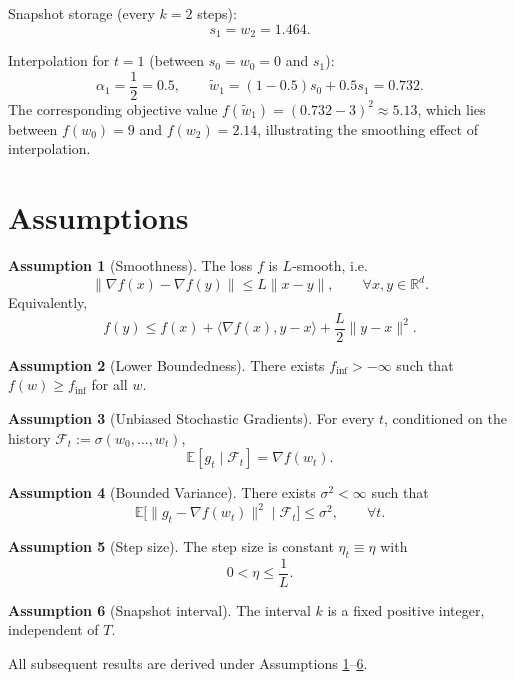 \documentclass{article}
\newcommand{\E}{\mathbb{E}}
\newcommand{\R}{\mathbb{R}}
\theoremstyle{definition}
\newtheorem{assumption}{Assumption}
\begin{document}
Snapshot storage (every $k=2$ steps):
\[
s_1 = w_{2}=1.464 .
\]

Interpolation for $t=1$ (between $s_0=w_0=0$ and $s_1$):
\[
\alpha_1=\frac{1}{2}=0.5,\qquad 
\tilde w_1 = (1-0.5) s_0 + 0.5 s_1 = 0.732 .
\]
The corresponding objective value $f(\tilde w_1)=(0.732-3)^2\approx5.13$,
which lies between $f(w_0)=9$ and $f(w_2)=2.14$, illustrating the smoothing
effect of interpolation.

\section*{Assumptions}
\begin{assumption}[Smoothness]\label{as:smooth}
The loss $f$ is $L$‑smooth, i.e.
\[
\|\nabla f(x)-\nabla f(y)\|\le L\|x-y\|,\qquad\forall x,y\in\R^{d}.
\]
Equivalently,
\[
f(y)\le f(x)+\langle\nabla f(x),y-x\rangle+\frac{L}{2}\|y-x\|^{2}.
\tag{A1}
\]
\end{assumption}

\begin{assumption}[Lower Boundedness]\label{as:lower}
There exists $f_{\inf}>-\infty$ such that $f(w)\ge f_{\inf}$ for all $w$.
\end{assumption}

\begin{assumption}[Unbiased Stochastic Gradients]\label{as:unbiased}
For every $t$, conditioned on the history $\mathcal{F}_t:=\sigma(w_0,\dots,w_t)$,
\[
\E[g_t\mid\mathcal{F}_t]=\nabla f(w_t).
\tag{A3}
\]
\end{assumption}

\begin{assumption}[Bounded Variance]\label{as:variance}
There exists $\sigma^{2}<\infty$ such that
\[
\E\big[\|g_t-\nabla f(w_t)\|^{2}\mid\mathcal{F}_t\big]\le\sigma^{2},
\qquad\forall t.
\tag{A4}
\]
\end{assumption}

\begin{assumption}[Step size]\label{as:stepsize}
The step size is constant $\eta_t\equiv\eta$ with
\[
0<\eta\le\frac{1}{L}.
\tag{A5}
\]
\end{assumption}

\begin{assumption}[Snapshot interval]\label{as:k}
The interval $k$ is a fixed positive integer, independent of $T$.
\end{assumption}

All subsequent results are derived under Assumptions
\ref{as:smooth}–\ref{as:k}.
\end{document}
